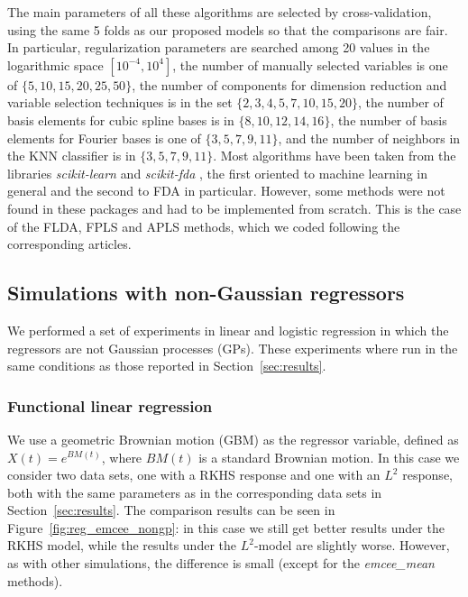 The main parameters of all these algorithms are selected by cross-validation, using the same 5 folds as our proposed models so that the comparisons are fair. In particular, regularization parameters are searched among 20 values in the logarithmic space \([10^{-4}, 10^4]\), the number of manually selected variables is one of \(\{5, 10, 15, 20, 25, 50\}\), the number of components for dimension reduction and variable selection techniques is in the set \(\{2, 3, 4, 5, 7, 10, 15, 20\}\), the number of basis elements for cubic spline bases is in \(\{8,10,12,14,16\}\), the number of basis elements for Fourier bases is one of \(\{3,5,7,9,11\}\), and the number of neighbors in the KNN classifier is in \(\{3,5,7,9,11\}\). Most algorithms have been taken from the libraries \textit{scikit-learn} \citep{pedregosa2011scikit} and \textit{scikit-fda} \citep{ramos2023scikit}, the first oriented to machine learning in general and the second to FDA in particular. However, some methods were not found in these packages and had to be implemented from scratch. This is the case of the FLDA, FPLS and APLS methods, which we coded following the corresponding articles.

\subsection{Simulations with non-Gaussian regressors}\label{app:non-gp}

We performed a set of experiments in linear and logistic regression in which the regressors are not Gaussian processes (GPs). These experiments where run in the same conditions as those reported in Section~\ref{sec:results}.

\subsubsection*{Functional linear regression}

We use a geometric Brownian motion (GBM) as the regressor variable, defined as \(X(t)=e^{BM(t)}\), where \(BM(t)\) is a standard Brownian motion. In this case we consider two data sets, one with a RKHS response and one with an \(L^2\) response, both with the same parameters as in the corresponding data sets in Section~\ref{sec:results}. The comparison results can be seen in Figure~\ref{fig:reg_emcee_nongp}: in this case we still get better results under the RKHS model, while the results under the \(L^2\)-model are slightly worse. However, as with other simulations, the difference is small (except for the \textit{emcee\_mean} methods).


